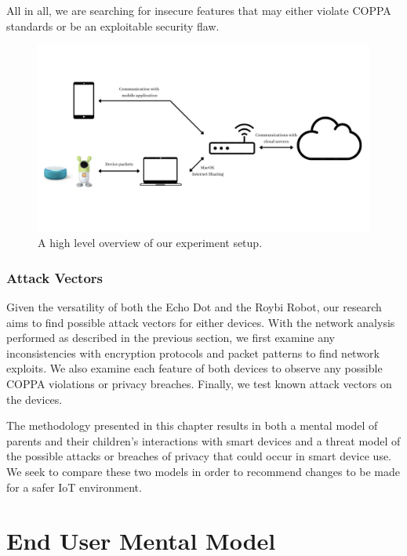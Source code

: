 \documentclass[12pt]{ucthesis}
\begin{document}
All in all, we are searching for insecure features that may either violate COPPA standards or be an exploitable security flaw.

\begin{figure}
    \includegraphics[width=\textwidth]{experiment.jpg}
    \caption{A high level overview of our experiment setup.}
    \label{fig:experiment}
\end{figure}

\subsection{Attack Vectors}
Given the versatility of both the Echo Dot and the Roybi Robot, our research aims to find possible attack vectors for either devices. With the network analysis performed as described in the previous section, we first examine any inconsistencies with encryption protocols and packet patterns to find network exploits. We also examine each feature of both devices to observe any possible COPPA violations or privacy breaches. Finally, we test known attack vectors on the devices. 

The methodology presented in this chapter results in both a mental model of parents and their children's interactions with smart devices and a threat model of the possible attacks or breaches of privacy that could occur in smart device use. We seek to compare these two models in order to recommend changes to be made for a safer IoT environment.

\chapter{End User Mental Model}
\label{ch:mental}
\end{document}
